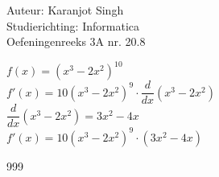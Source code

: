 \documentclass[a4paper]{article}
\begin{document}
	
\noindent \large Auteur: Karanjot Singh \\
\noindent \large Studierichting: Informatica \\
\noindent \large Oefeningenreeks 3A nr. 20.8 \\

\normalsize

$f(x) = \left( x^3 - 2x^2 \right)^{10}$\\

$f'(x) = 10 \left( x^3 - 2x^2 \right)^{9} \cdot \dfrac{d}{dx} \left( x^3 - 2x^2 \right)$\\

$\dfrac{d}{dx} \left( x^3 - 2x^2 \right) = 3x^2 - 4x$\\

$f'(x) = 10 \left( x^3 - 2x^2 \right)^{9} \cdot \left( 3x^2 - 4x \right)$\\

\begin{thebibliography}{999}
\end{thebibliography}
\end{document}
